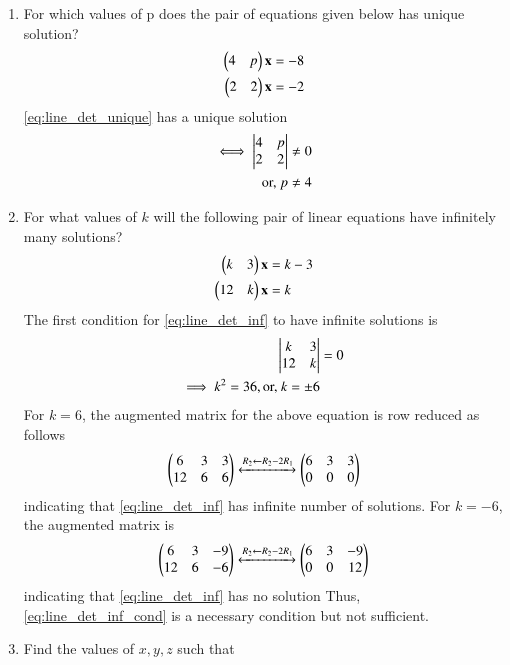 \begin{enumerate}[label=\arabic*.,ref=\thesubsection.\theenumi]
\item For which values of p does the pair of equations given below has unique solution?
\begin{align}
\label{eq:line_det_unique}
\begin{split}
\begin{pmatrix}4 & p \end{pmatrix}\mathbf{x}&=-8
\\
\begin{pmatrix}2 & 2 \end{pmatrix}\mathbf{x}&=-2
\end{split}
\end{align}
%
\solution \eqref{eq:line_det_unique} has a unique solution 
\begin{align}
\iff \begin{vmatrix}4 & p \\ 2 & 2\end{vmatrix} \ne 0
\\
\text{or, } p \ne 4
\end{align}
%
\item For what values of $k$ will the following pair of linear equations have infinitely many solutions?
%
\begin{align}
\label{eq:line_det_inf}
\begin{split}
\begin{pmatrix}k & 3 \end{pmatrix}\mathbf{x}&=k-3
\\
\begin{pmatrix}12 & k \end{pmatrix}\mathbf{x}&=k
\end{split}
\end{align}
%
\solution The first condition for \eqref{eq:line_det_inf} to have infinite solutions is 
%
\begin{align}
\label{eq:line_det_inf_cond}
\begin{vmatrix}k & 3 \\12 & k  \end{vmatrix} &= 0
\\
\implies k^2 = 36, \text{or, } k = \pm 6
\end{align}
%
For $k = 6$, 
%
the augmented matrix for the above equation is row reduced as follows
\begin{align}
\begin{pmatrix}6 & 3 & 3\\12 &  6 & 6\end{pmatrix} 
\xleftrightarrow {R_2\leftarrow R_2-2R_1}\begin{pmatrix}6 & 3 & 3\\0 &  0 & 0\end{pmatrix} 
\end{align}
%
indicating that \eqref{eq:line_det_inf} has infinite number of solutions. For $k = -6$, the augmented matrix is 
\begin{align}
\begin{pmatrix}6 & 3 & -9\\12 &  6 & -6\end{pmatrix} 
\xleftrightarrow {R_2\leftarrow R_2-2R_1}\begin{pmatrix}6 & 3 & -9\\0 &  0 & 12\end{pmatrix} 
\end{align}
indicating that \eqref{eq:line_det_inf} has no solution
%
Thus, \eqref{eq:line_det_inf_cond} is a necessary condition but not sufficient.
%
\item Find the values of $x, y, z$ such that 

\end{enumerate}
